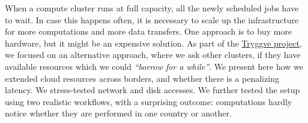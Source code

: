 When a compute cluster runs at full capacity, all the newly scheduled
jobs have to wait. In case this happens often, it is necessary to
scale up the infrastructure for more computations and more data
transfers.
%
One approach is to buy more hardware, but it might be an expensive
solution.
%
As part of the \href{https://wiki.neic.no/wiki/Tryggve}{Tryggve
project}, we focused on an alternative approach, where we ask other
clusters, if they have available resources which we could
\emph{``borrow for a while''}.
%
We present here how we extended cloud resources across borders, and
whether there is a penalizing latency.
%
We stress-tested network and disk accesses. We further tested the
setup using two realistic workflows, with a surprising outcome:
computations hardly notice whether they are performed in one country
or another.
%
